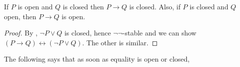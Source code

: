 %
%
\begin{lemma}\label{ImplicationOpenClosed}
  If $P$ is open %
  and $Q$ is closed %
  then $P\to Q$ is closed.%
  Also, if $P$ is closed and $Q$ open, then $P\to Q$ is open. 
\end{lemma}
\begin{proof}
  By , $\neg P \vee Q$ is closed, hence $\neg\neg$-stable 
  and we can show $(P\to Q) \leftrightarrow (\neg P \vee Q)$. 
  The other is similar. 
\end{proof}
%
The following says that as soon as equality is open or closed, 
